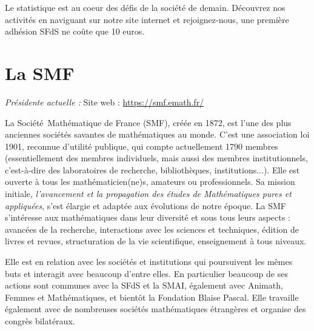 Le statistique est au coeur des d\'efis de la soci\'et\'e de demain. D\'ecouvrez nos activit\'es en naviguant sur notre site internet et rejoignez-nous, une premi\`ere adh\'esion SFdS ne co\^ute que 10 euros.



\section{La SMF}
\label{smf}

\emph{Pr\'esident\mp e actuel\mp le : } \hfill Site web :  \url{https://smf.emath.fr/}
\smallskip

La Soci\'et\'e\ Math\'ematique de France (SMF), cr\'e\'ee en 1872, est l'une des plus anciennes  soci\'et\'es savantes de math\'ematiques au monde. C'est une association loi 1901, reconnue d'utilit\'e publique, qui compte actuellement 1790 membres (essentiellement des membres individuels, mais aussi des membres institutionnels, c'est-\`a-dire des laboratoires de recherche, biblioth\`eques, institutions...). Elle est ouverte \`a tous les
math\'ematicien(ne)s, amateurs ou professionnels. Sa mission initiale, {\sl l'avancement et la propagation des \'etudes de Math\'ematiques pures et appliqu\'ees}, s'est \'elargie et adapt\'ee aux \'evolutions de notre \'epoque. La SMF s'int\'eresse aux math\'ematiques  dans leur diversit\'e et sous tous leurs aspects :  avanc\'ees de la recherche, interactions avec les sciences et techniques, \'edition de livres et revues,  structuration de la vie scientifique, enseignement \`a tous niveaux.

Elle est en relation avec les soci\'et\'es et institutions qui poursuivent les m\^emes buts et interagit avec beaucoup d'entre elles. En particulier beaucoup de ses actions sont communes avec la SFdS et la SMAI, \'{e}galement avec Animath, Femmes et Math\'{e}matiques, et bient\^ot la Fondation Blaise Pascal. Elle  travaille \'egalement avec de nombreuses soci\'et\'es math\'ematiques \'{e}trang\`{e}res et organise des congr\`{e}s bilat\'{e}raux.



